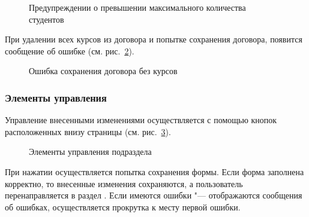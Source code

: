 \begin{itemize}
		\begin{figure}[H]
		\caption{Предупреждении о превышении максимального количества студентов}
		\label{agreement:edit_course_warn_cancel}
		\end{figure}
			
При удалении всех курсов из договора и попытке сохранения договора, появится сообщение об ошибке (см. рис.~\ref{agreement:edit_course_nothing}).
	
		\begin{figure}[H]
		\caption{Ошибка сохранения договора без курсов}
		\label{agreement:edit_course_nothing}
		\end{figure}

 	\end{itemize}
 	
\subsubsection{Элементы управления}
Управление внесенными изменениями осуществляется с помощью кнопок расположенных внизу страницы (см. рис.~\ref{agreement:edit_buttons}).
		\begin{figure}[H]
		\caption{Элементы управления подраздела }
		\label{agreement:edit_buttons}
		\end{figure}	
		
При нажатии  осуществляется попытка сохранения формы. 
Если форма заполнена корректно, то внесенные изменения сохраняются, а пользователь перенаправляется в раздел .
Если имеются ошибки "--- отображаются сообщения об ошибках, осуществляется прокрутка к месту первой ошибки. 

